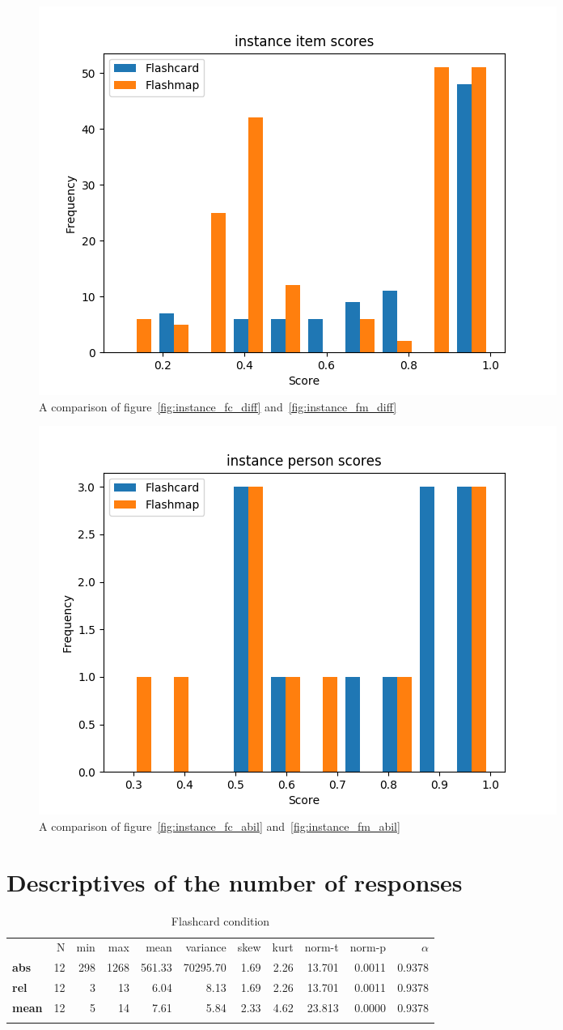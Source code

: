 \begin{figure}
    \centering
    \includegraphics[width=.7\textwidth]{img/instance_diff.png}
    \caption{A comparison of figure~\protect\ref{fig:instance_fc_diff} and~\protect\ref{fig:instance_fm_diff}}
    \label{fig:instance_diff}
\end{figure}
\begin{figure}
    \centering
    \includegraphics[width=.7\textwidth]{img/instance_abil.png}
    \caption{A comparison of figure~\protect\ref{fig:instance_fc_abil} and~\protect\ref{fig:instance_fm_abil}}
    \label{fig:instance_abil}
\end{figure}

\FloatBarrier
\section{Descriptives of the number of responses}

\begin{longtable}[c]{@{}lrrrrrrrrrr@{}}
\caption{Flashcard condition}
\endfirsthead
\endhead
\toprule\addlinespace
& N & min & max & mean & variance & skew & kurt & norm-t &
norm-p & $\alpha$
\\\addlinespace
\midrule
\textbf{abs} & 12 & 298 & 1268 & 561.33 & 70295.70 & 1.69 & 2.26 &
13.701 & 0.0011 & 0.9378
\\\addlinespace
\textbf{rel} & 12 & 3 & 13 & 6.04 & 8.13 & 1.69 & 2.26 & 13.701 & 0.0011
& 0.9378
\\\addlinespace
\textbf{mean} & 12 & 5 & 14 & 7.61 & 5.84 & 2.33 & 4.62 & 23.813 &
0.0000 & 0.9378
\\\addlinespace
\bottomrule
    \label{tab:responses_fc}
\end{longtable}

